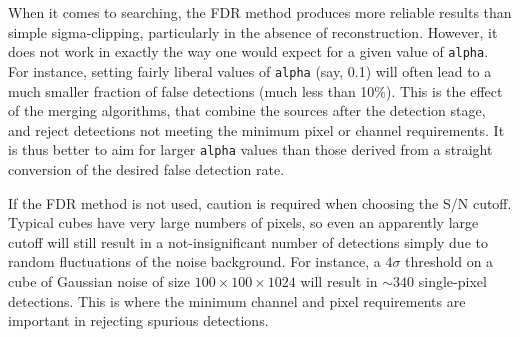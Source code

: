 When it comes to searching, the FDR method produces more reliable
results than simple sigma-clipping, particularly in the absence of
reconstruction.  However, it does not work in exactly the way one
would expect for a given value of \texttt{alpha}. For instance,
setting fairly liberal values of \texttt{alpha} (say, 0.1) will often
lead to a much smaller fraction of false detections (\ie much less
than 10\%). This is the effect of the merging algorithms, that combine
the sources after the detection stage, and reject detections not
meeting the minimum pixel or channel requirements.  It is thus better
to aim for larger \texttt{alpha} values than those derived from a
straight conversion of the desired false detection rate.

If the FDR method is not used, caution is required when choosing the
S/N cutoff. Typical cubes have very large numbers of pixels, so even
an apparently large cutoff will still result in a not-insignificant
number of detections simply due to random fluctuations of the noise
background. For instance, a $4\sigma$ threshold on a cube of Gaussian
noise of size $100\times100\times1024$ will result in $\sim340$
single-pixel detections. This is where the minimum channel and pixel
requirements are important in rejecting spurious detections.

